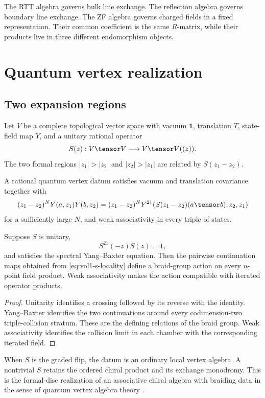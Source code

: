 The RTT algebra governs bulk line exchange.  The reflection algebra governs boundary line exchange.  The ZF algebra governs charged fields in a fixed representation.  Their common coefficient is the same $R$-matrix, while their products live in three different endomorphism objects.

\chapter{Quantum vertex realization}
\section{Two expansion regions}
Let $V$ be a complete topological vector space with vacuum $\mathbf1$, translation $T$, state-field map $Y$, and a unitary rational operator
\[
 S(z):V\tensor V\longrightarrow V\tensor V((z)).
\]
The two formal regions $|z_1|>|z_2|$ and $|z_2|>|z_1|$ are related by $S(z_1-z_2)$.

\begin{definition}
A rational quantum vertex datum satisfies vacuum and translation covariance together with
\begin{equation}\label{eq:vol1-s-locality}
 (z_1-z_2)^N Y(a,z_1)Y(b,z_2)
 =(z_1-z_2)^N
 Y^{21}\!\left(S(z_1-z_2)(a\tensor b);z_2,z_1\right)
\end{equation}
for a sufficiently large $N$, and weak associativity in every triple of states.
\end{definition}

\begin{theorem}
Suppose $S$ is unitary,
\[
 S^{21}(-z)S(z)=1,
\]
and satisfies the spectral Yang--Baxter equation.  Then the pairwise continuation maps obtained from \eqref{eq:vol1-s-locality} define a braid-group action on every $n$-point field product.  Weak associativity makes the action compatible with iterated operator products.
\end{theorem}
\begin{proof}
Unitarity identifies a crossing followed by its reverse with the identity.  Yang--Baxter identifies the two continuations around every codimension-two triple-collision stratum.  These are the defining relations of the braid group.  Weak associativity identifies the collision limit in each chamber with the corresponding iterated field.
\end{proof}

When $S$ is the graded flip, the datum is an ordinary local vertex algebra.  A nontrivial $S$ retains the ordered chiral product and its exchange monodromy.  This is the formal-disc realization of an associative chiral algebra with braiding data in the sense of quantum vertex algebra theory \cite{LiNonlocal,LiQVA}.


